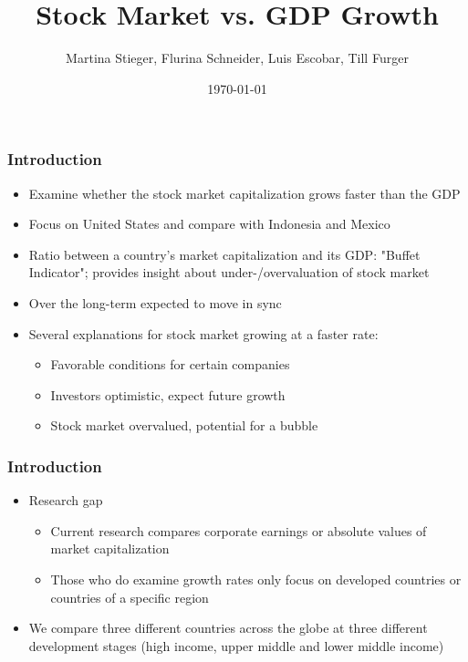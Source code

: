 \documentclass{beamer}
\title{Stock Market vs. GDP Growth}
\author{Martina Stieger, Flurina Schneider,  \newline Luis Escobar, Till Furger }
\institute{}
\date{\today}
\begin{document}
\frame{\titlepage}


\begin{frame}
\frametitle{Introduction}
\begin{itemize}
\item Examine whether the stock market capitalization grows faster than the 
GDP
\item Focus on United States and compare with Indonesia and Mexico
\item Ratio between a country's market capitalization and its GDP: "Buffet Indicator"; provides insight about under-/overvaluation of stock market 
\item Over the long-term expected to move in sync
\item Several explanations for stock market growing at a faster rate: 
\begin{itemize}
\item Favorable conditions for certain companies
\item Investors optimistic, expect future growth  
\item Stock market overvalued, potential for a bubble
\end{itemize}
\end{itemize}
\end{frame}


\begin{frame}
\frametitle{Introduction}
\begin{itemize}
\item Research gap
\begin{itemize}
\item Current research compares corporate earnings or absolute values of market capitalization
\item Those who do examine growth rates only focus on developed countries or countries of a specific region 
\end{itemize}
\item We compare three different countries across the globe at three different development stages (high income, upper middle and lower middle income)
\end{itemize}
\end{frame}
\end{document}
